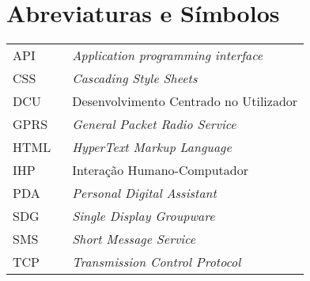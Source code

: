 \chapter*{Abreviaturas e Símbolos}

\begin{flushleft}
\begin{tabular}{l p{0.8\linewidth}}
API     & \textit{Application programming interface}\\
CSS     & \textit{Cascading Style Sheets}\\
DCU     & Desenvolvimento Centrado no Utilizador\\
GPRS    & \textit{General Packet Radio Service}\\
HTML    & \textit{HyperText Markup Language}\\
IHP     & Interação Humano-Computador\\
PDA     & \textit{Personal Digital Assistant}\\
SDG     & \textit{Single Display Groupware}\\
SMS     & \textit{Short Message Service}\\
TCP     & \textit{Transmission Control Protocol}\\
\end{tabular}
\end{flushleft}

